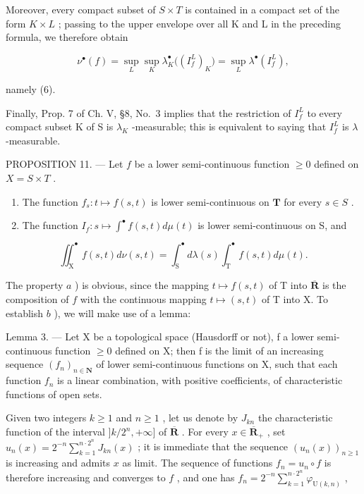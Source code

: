 Moreover, every compact subset of \(S \times T\) is contained in a compact set of the form \(K \times L\) ; passing to the upper envelope over all K and L in the preceding formula, we therefore obtain

\[
\nu^ {\bullet} (f) = \sup _ {L} \sup _ {K} \lambda_ {K} ^ {\bullet} \big ((I _ {f} ^ {L}) _ {K} \big) = \sup _ {L} \lambda^ {\bullet} (I _ {f} ^ {L}),\tag{8}
\]

namely (6).

Finally, Prop. 7 of Ch. V, §8, No.~3 implies that the restriction of \(I_{f}^{L}\) to every compact subset K of S is \(\lambda_{K}\) -measurable; this is equivalent to saying that \(I_{f}^{L}\) is \(\lambda\) -measurable.

PROPOSITION 11. --- Let \(f\) be a lower semi-continuous function \(\geqslant 0\) defined on \(X = S \times T\) .

\begin{enumerate}
\def\labelenumi{\alph{enumi})}
\item
  The function \(f_{s}: t \mapsto f(s, t)\) is lower semi-continuous on \(\mathbf{T}\) for every \(s \in S\) .
\item
  The function \(I_{f}: s \mapsto \int^{\bullet} f(s, t) d\mu(t)\) is lower semi-continuous on S, and
\end{enumerate}

\[
\iint_ {\mathrm{X}} ^ {\bullet} f (s, t) d \nu (s, t) = \int_ {\mathrm{S}} ^ {\bullet} d \lambda (s) \int_ {\mathrm{T}} ^ {\bullet} f (s, t) d \mu (t).\tag{9}
\]

The property \(a\) ) is obvious, since the mapping \(t \mapsto f(s,t)\) of T into \(\overline{\mathbf{R}}\) is the composition of \(f\) with the continuous mapping \(t \mapsto (s,t)\) of T into X. To establish \(b\) ), we will make use of a lemma:

Lemma 3. --- Let X be a topological space (Hausdorff or not), f a lower semi-continuous function \(\geqslant 0\) defined on X; then f is the limit of an increasing sequence \((f_{n})_{n\in\mathbf{N}}\) of lower semi-continuous functions on X, such that each function \(f_{n}\) is a linear combination, with positive coefficients, of characteristic functions of open sets.

Given two integers \(k \geqslant 1\) and \(n \geqslant 1\) , let us denote by \(J_{kn}\) the characteristic function of the interval \(]k/2^n, +\infty]\) of \(\overline{\mathbf{R}}\) . For every \(x \in \overline{\mathbf{R}}_+\) , set \(u_n(x) = 2^{-n} \sum_{k=1}^{n \cdot 2^n} J_{kn}(x)\) ; it is immediate that the sequence \((u_n(x))_{n \geqslant 1}\) is increasing and admits \(x\) as limit. The sequence of functions \(f_n = u_n \circ f\) is therefore increasing and converges to \(f\) , and one has \(f_{n} = 2^{-n}\sum_{k = 1}^{n\cdot 2^{n}}\varphi_{\mathrm{U}(k,n)}\) ,


